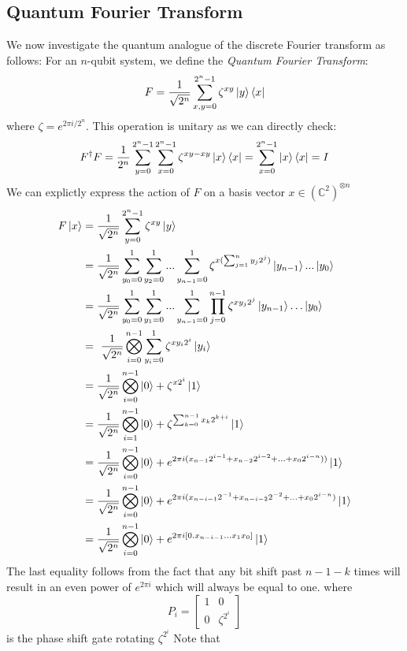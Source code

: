 \documentclass{../quantum.tex}
\begin{document}
\subsection{Quantum Fourier Transform}

We now investigate the quantum analogue of the discrete Fourier transform as follows:
%
For an $n$-qubit system, we define the \textit{Quantum Fourier Transform}:
%
$$ F = \frac{1}{\sqrt{2^n}} \sum_{x,y = 0}^{2^n-1} \zeta^{xy} \ket{y}\bra{x} $$
 where $\zeta = e^{2\pi i /2^n} $.
%
 This operation is unitary as we can directly check:
 $$ F^{\dagger}F = \frac{1}{2^n} \sum_{y = 0}^{2^n-1} \sum_{x = 0}^{2^n-1} \zeta^{xy - xy} \ket{x}\bra{x} = \sum_{x = 0}^{2^n -1} \ket{x}\bra{x} = I $$
%
 We can explictly express the action of $F$ on a basis vector $x \in (\mathbb{C}^2)^{\otimes n}$
\begin{gather*}
  \begin{split}
    F\ket{x} & = \frac{1}{\sqrt{2^n}} \sum_{y=0}^{2^n-1} \zeta^{xy} \ket{y} \\
     & = \frac{1}{\sqrt{2^n}} \sum_{y_0=0}^{1}\sum_{y_2=0}^{1}...\sum_{y_{n-1}=0}^{1} \zeta^{x(\sum_{j=1}^n y_j2^j)} \ket{y_{n-1}} ...\ket{y_0} \\
     & = \frac{1}{\sqrt{2^n}} \sum_{y_0=0}^{1}\sum_{y_1=0}^{1}...\sum_{y_{n-1}=0}^{1} \prod_{j=0}^{n-1} \zeta^{xy_j2^j} \ket{y_{n-1}} \ldots \ket{y_0}  \\
    & = \frac{1}{\sqrt{2^n}} \bigotimes_{i=0}^{n-1}\sum_{y_i=0}^1 \zeta^{xy_i2^i} \ket{y_i} \\
    & = \frac{1}{\sqrt{2^n}} \bigotimes_{i=0}^{n-1}\ket{0} + \zeta^{x2^i}\ket{1} \\
    & = \frac{1}{\sqrt{2^n}} \bigotimes_{i=1}^{n-1}\ket{0} + \zeta^{\sum_{k=0}^{n-1} x_k2^{k+i}}\ket{1} \\
    & = \frac{1}{\sqrt{2^n}} \bigotimes_{i=0}^{n-1}\ket{0} + e^{2\pi i(x_{n-1}2^{i-1} +x_{n-2}2^{i-2} + \ldots + x_{0} 2^{i-n}))}\ket{1} \\
    & = \frac{1}{\sqrt{2^n}} \bigotimes_{i=0}^{n-1}\ket{0} + e^{2\pi i(x_{n- i - 1}2^{-1} +x_{n- i - 2}2^{-2} + \ldots + x_{0} 2^{i-n})}\ket{1} \\
    & = \frac{1}{\sqrt{2^n}} \bigotimes_{i=0}^{n-1}\ket{0} + e^{2\pi i [ 0.x_{n-i-1}\ldots x_1x_0 ]} \ket{1}
  \end{split}
\end{gather*}
%
The last equality follows from the fact that any bit shift past $n-1-k$ times will result in an even power of $e^{2\pi i}$ which will always be equal to one.
where
$$P_i = \left[\begin{matrix} 1 & 0 \\ 0 & \zeta^{2^i} \end{matrix}\right]$$ is the phase shift gate rotating $\zeta^{2^i}$ Note that
\end{document}
